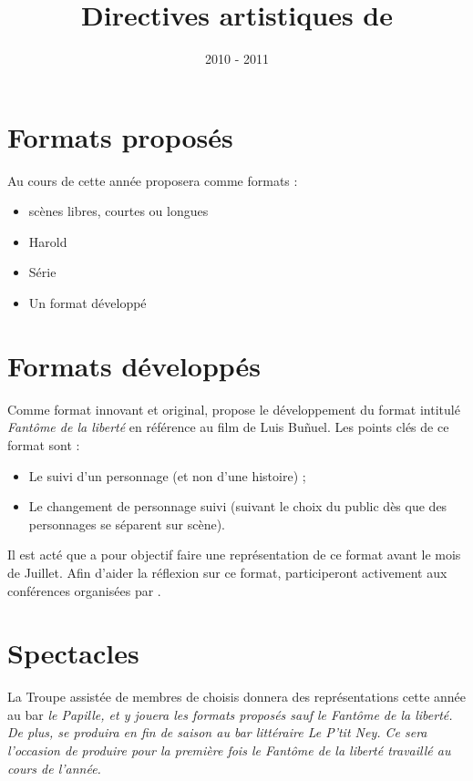 \documentclass[a4paper,french,10pt]{article}
\title{Directives artistiques de \meta{}}
\begin{document}
\date{2010 - 2011}

\maketitle 
\pagestyle{fancy} 


\section{Formats proposés}
Au cours de cette année \troupe{} proposera comme formats :
\begin{itemize}
\item scènes libres, courtes ou longues
\item Harold
\item Série
\item Un format développé
\end{itemize}

\section{Formats développés}
Comme format innovant et original, \troupe{} propose le développement du format intitulé \textit{Fantôme de la liberté} en référence au film de Luis Buñuel.
Les points clés de ce format sont :
\begin{itemize}
\item Le suivi d'un personnage (et non d'une histoire) ;
\item Le changement de personnage suivi (suivant le choix du public dès que des personnages se séparent sur scène).
\end{itemize}
Il est acté que \troupe{} a pour objectif faire une représentation de ce format avant le mois de Juillet.
Afin d'aider la réflexion sur ce format, \troupe{} participeront activement aux conférences organisées par \meta{}.

\section{Spectacles}
La Troupe assistée de membres de \meta{} choisis donnera des représentations cette année au bar \em{le Papille}, et y jouera les formats proposés sauf le \textit{Fantôme de la liberté}. De plus, \meta{} se produira en fin de saison au bar littéraire \em{Le P'tit Ney}. Ce sera l'occasion de produire pour la première fois le \textit{Fantôme de la liberté} travaillé au cours de l'année.
\end{document}
